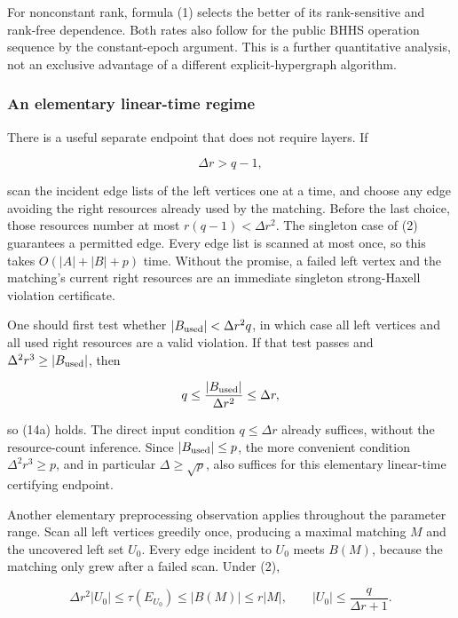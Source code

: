 For nonconstant rank, formula (1) selects the better of its rank-sensitive and rank-free dependence. Both rates also follow for the public BHHS operation sequence by the constant-epoch argument. This is a further quantitative analysis, not an exclusive advantage of a different explicit-hypergraph algorithm.

\hypertarget{af-6a8212874a-an-elementary-linear-time-regime}{%
\subsubsection{An elementary linear-time regime}\label{af-6a8212874a-an-elementary-linear-time-regime}}

There is a useful separate endpoint that does not require layers. If

\[
\Delta r>q-1,
 \tag{14a}
\]

scan the incident edge lists of the left vertices one at a time, and choose any edge avoiding the right resources already used by the matching. Before the last choice, those resources number at most \(r(q-1)<\Delta r^2\). The singleton case of (2) guarantees a permitted edge. Every edge list is scanned at most once, so this takes \(O(|A|+|B|+p)\) time. Without the promise, a failed left vertex and the matching's current right resources are an immediate singleton strong-Haxell violation certificate.

One should first test whether \(|B_{\rm used}|<\Delta r^2q\), in which case all left vertices and all used right resources are a valid violation. If that test passes and \(\Delta^2r^3\ge |B_{\rm used}|\), then

\[
q\le\frac{|B_{\rm used}|}{\Delta r^2}
   \le\Delta r,
\]

so (14a) holds. The direct input condition \(q\le\Delta r\) already suffices, without the resource-count inference. Since \(|B_{\rm used}|\le p\), the more convenient condition \(\Delta^2r^3\ge p\), and in particular \(\Delta\ge\sqrt p\), also suffices for this elementary linear-time certifying endpoint.

Another elementary preprocessing observation applies throughout the parameter range. Scan all left vertices greedily once, producing a maximal matching \(M\) and the uncovered left set \(U_0\). Every edge incident to \(U_0\) meets \(B(M)\), because the matching only grew after a failed scan. Under (2),

\[
\Delta r^2|U_0|
   \le\tau(E_{U_0})\le |B(M)|\le r|M|,
 \qquad
 |U_0|\le\frac{q}{\Delta r+1}.
 \tag{14b}
\]

